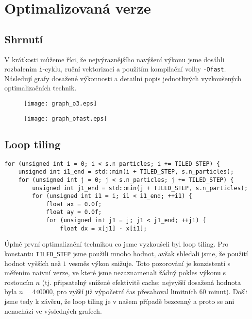\documentclass[10pt,a4paper]{article}
\begin{document}
\pagebreak
\section{Optimalizovaná verze}

\subsection{Shrnutí}
V krátkosti můžeme říci, že nejvýraznějšího navýšení výkonu jsme
dosáhli rozbalením \texttt{i}-cyklu, ruční vektorizací a použitím
kompilační volby \texttt{-Ofast}. Následují grafy dosažené výkonnosti
a detailní popis jednotlivých vyzkoušených optimalizačních technik.

\begin{figure}[h!]
    \centering
    \texttt{[image: graph\_o3.eps]}
    \label{fig:1}
\end{figure}

\begin{figure}[h!]
    \centering
    \texttt{[image: graph\_ofast.eps]}
    \label{fig:2}
\end{figure}

\subsection{Loop tiling}
\begin{lstlisting}
for (unsigned int i = 0; i < s.n_particles; i += TILED_STEP) {
    unsigned int i1_end = std::min(i + TILED_STEP, s.n_particles);
    for (unsigned int j = 0; j < s.n_particles; j += TILED_STEP) {
        unsigned int j1_end = std::min(j + TILED_STEP, s.n_particles);
        for (unsigned int i1 = i; i1 < i1_end; ++i1) {
            float ax = 0.0f;
            float ay = 0.0f;
            for (unsigned int j1 = j; j1 < j1_end; ++j1) {
                float dx = x[j1] - x[i1];
\end{lstlisting}

Úplně první optimalizační technikou co jsme vyzkoušeli byl loop
tiling. Pro konstantu \texttt{TILED\_STEP} jsme použili mnoho hodnot,
avšak shledali jsme, že použití hodnot vyšších než $ 1 $ vesměs výkon
snižuje. Toto pozorování je konzistentí s měřením naivní verze, ve
které jsme nezaznamenali žádný pokles výkonu s rostoucím $ n $
(tj. připsatelný snížené efektivitě cache; nejvyšší dosažená hodnota
byla $ n = 440000 $, pro vyšší již výpočetní čas přesahoval limitních
60 minut). Došli jsme tedy k závěru, že loop tiling je v našem případě
bezcenný a proto se ani nenachází ve výsledných grafech.
\end{document}
